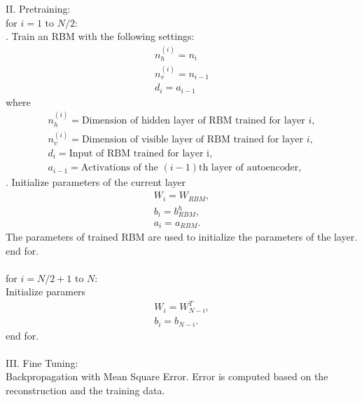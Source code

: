 \documentclass[12pt]{article}
\begin{document}
II. Pretraining:\\
for $i = 1\text{ to }N/2$:\\
. Train an RBM with the following settings:\\
\begin{gather*}
n_h^{(i)}=n_i\\
n_v^{(i)}=n_{i-1}\\
d_i=a_{i-1}
\end{gather*}
\indent where
\begin{gather*}
n_h^{(i)} = \text{Dimension of hidden layer of RBM trained for layer }i,\\
n_v^{(i)} = \text{Dimension of visible layer of RBM trained for layer }i,\\
d_i = \text{Input of RBM trained for layer i},\\
a_{i-1} = \text{Activations of the }(i-1)\text{th layer of autoencoder},
\end{gather*}
. Initialize parameters of the current layer
\begin{gather*}
W_i = W_{RBM},\\
b_i = b^h_{RBM},\\
a_i = a_{RBM}.
\end{gather*}
\indent The parameters of trained RBM are used to initialize the parameters of the layer.\\
end for.\\
\\
for $i = N/2+1\text{ to }N$:\\
\indent Initialize paramers \begin{gather*}
W_i = W_{N - i}^{T},\\
b_i = b_{N-i}.
\end{gather*}
end for.\\
\\
III. Fine Tuning:\\
Backpropagation with Mean Square Error. Error is computed based on the reconstruction and the training data.
\end{document}
